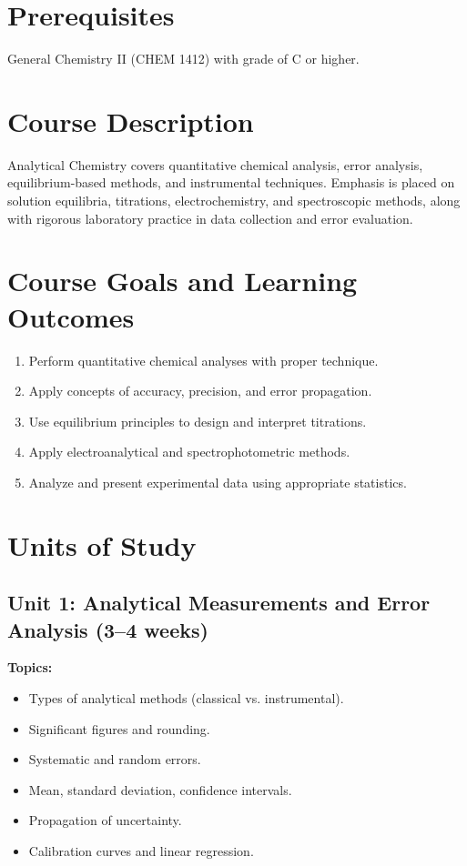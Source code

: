 \documentclass[12pt,oneside]{book}
\begin{document}
\section{Prerequisites}

General Chemistry II (CHEM 1412) with grade of C or higher.

\section{Course Description}

Analytical Chemistry covers quantitative chemical analysis, error analysis, equilibrium-based methods, and instrumental techniques. Emphasis is placed on solution equilibria, titrations, electrochemistry, and spectroscopic methods, along with rigorous laboratory practice in data collection and error evaluation.

\section{Course Goals and Learning Outcomes}

\begin{enumerate}
    \item Perform quantitative chemical analyses with proper technique.
    \item Apply concepts of accuracy, precision, and error propagation.
    \item Use equilibrium principles to design and interpret titrations.
    \item Apply electroanalytical and spectrophotometric methods.
    \item Analyze and present experimental data using appropriate statistics.
\end{enumerate}

\section{Units of Study}

\subsection{Unit 1: Analytical Measurements and Error Analysis (3--4 weeks)}

\textbf{Topics:}
\begin{itemize}
    \item Types of analytical methods (classical vs. instrumental).
    \item Significant figures and rounding.
    \item Systematic and random errors.
    \item Mean, standard deviation, confidence intervals.
    \item Propagation of uncertainty.
    \item Calibration curves and linear regression.
\end{itemize}
\end{document}
